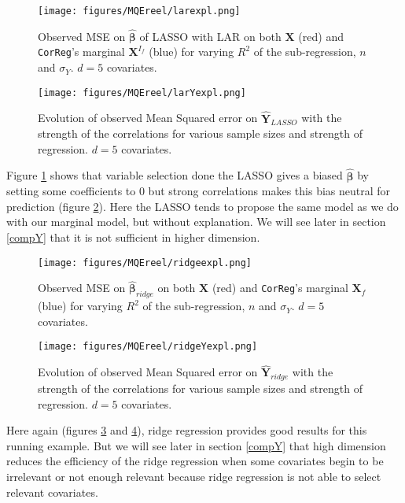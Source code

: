 \documentclass[12pt,a4paper]{report}
\begin{document}
	
 \begin{figure}[h!]
	\texttt{[image: figures/MQEreel/larexpl.png]}
	\caption{Observed MSE on $\hat{\boldsymbol{\beta}}$ of LASSO with LAR on both $\boldsymbol{X}$ (red) and {\tt CorReg}'s marginal $\boldsymbol{X}^{I_f}$ (blue) for varying $R^2$ of the sub-regression, $n$ and $\sigma_Y$. $d=5$ covariates.}\label{MSElarexpl}
\end{figure} 
	
	 \begin{figure}
	 \centering
	  \texttt{[image: figures/MQEreel/larYexpl.png]}
	  \caption{Evolution of observed Mean Squared error on $\hat{\boldsymbol{Y}}_{LASSO}$ with the strength of the correlations for various sample sizes and strength of regression. $d=5$ covariates. } \label{MQElarYexpl}
	\end{figure}
	Figure \ref{MSElarexpl} shows that variable selection done the LASSO gives a biased $\hat{\boldsymbol{\beta}}$ by setting some coefficients to 0 but strong correlations makes this bias neutral for prediction (figure \ref{MQElarYexpl}). Here the LASSO tends to propose the same model as we do  with our marginal model, but without explanation. We will see  later in section \ref{compY} that it is not sufficient in higher dimension. \\
	\begin{figure}[h!]
	\texttt{[image: figures/MQEreel/ridgeexpl.png]}
	\caption{Observed MSE on $\hat{\boldsymbol{\beta}}_{ridge}$ on both $\boldsymbol{X}$ (red) and {\tt CorReg}'s marginal $\boldsymbol{X}_f$ (blue) for varying $R^2$ of the sub-regression, $n$ and $\sigma_Y$. $d=5$ covariates.}\label{MSEridgexpl}
\end{figure} 
	
	 \begin{figure}
	 \centering
	  \texttt{[image: figures/MQEreel/ridgeYexpl.png]}
	  \caption{Evolution of observed Mean Squared error on $\hat{\boldsymbol{Y}}_{ridge}$ with the strength of the correlations for various sample sizes and strength of regression. $d=5$ covariates. } \label{MQEridgeYexpl}
	\end{figure}	
Here again (figures \ref{MSEridgexpl} and \ref{MQEridgeYexpl}), ridge regression provides good results for this running example. But we will see later in section \ref{compY} that high dimension reduces the efficiency of the ridge regression when some covariates begin to be irrelevant or not enough relevant because ridge regression is not able to select relevant covariates. \\
\end{document}
